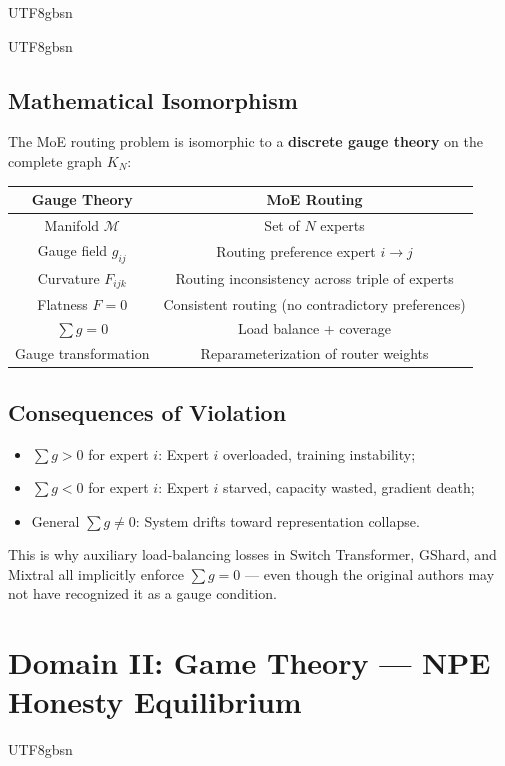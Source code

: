 \documentclass[11pt,a4paper]{article}
\newcommand{\Manifold}{\mathcal{M}}
\begin{document}
\begin{CJK}{UTF8}{gbsn}
{\begin{CJK}{UTF8}{gbsn}
\subsection{Mathematical Isomorphism}
The MoE routing problem is isomorphic to a \textbf{discrete gauge theory} on the complete
graph $K_N$:
\begin{center}
\begin{tabular}{c|c}
    \textbf{Gauge Theory} & \textbf{MoE Routing} \\
    \hline
    Manifold $\Manifold$ & Set of $N$ experts \\
    Gauge field $g_{ij}$ & Routing preference expert $i \to j$ \\
    Curvature $F_{ijk}$ & Routing inconsistency across triple of experts \\
    Flatness $F=0$ & Consistent routing (no contradictory preferences) \\
    $\sum g = 0$ & Load balance + coverage \\
    Gauge transformation & Reparameterization of router weights \\
\end{tabular}
\end{center}
\subsection{Consequences of Violation}
\begin{itemize}
    \item $\sum g > 0$ for expert $i$: Expert $i$ overloaded, training instability;
    \item $\sum g < 0$ for expert $i$: Expert $i$ starved, capacity wasted, gradient death;
    \item General $\sum g \neq 0$: System drifts toward representation collapse.
\end{itemize}
This is why auxiliary load-balancing losses in Switch Transformer, GShard, and
Mixtral all implicitly enforce $\sum g = 0$ --- even though the original authors
may not have recognized it as a gauge condition.
\end{CJK}
\section{Domain II: Game Theory --- NPE Honesty Equilibrium}
\label{sec:game}
\begin{CJK}{UTF8}{gbsn}

\end{CJK}}
\end{CJK}
\end{document}
